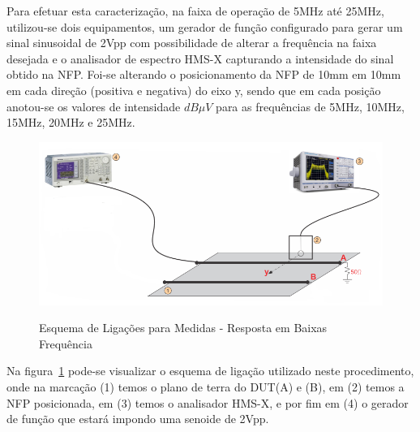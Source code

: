 Para efetuar esta caracterização, na faixa de operação de 5MHz até 25MHz, utilizou-se dois equipamentos, um gerador de função configurado para gerar um sinal sinusoidal de 2Vpp com possibilidade de alterar a frequência na faixa desejada e o analisador de espectro HMS-X capturando a intensidade do sinal obtido na NFP. Foi-se alterando o posicionamento da NFP de 10mm em 10mm em cada direção (positiva e negativa) do eixo y, sendo que em cada posição anotou-se os valores de intensidade $dB\mu V$ para as frequências de 5MHz, 10MHz, 15MHz, 20MHz e 25MHz.

\begin{figure}[htb!]
	\centering 
	\caption{Esquema de Ligações para Medidas - Resposta em Baixas Frequência}
	\includegraphics[scale=2.4]{./img/esquema4_fundo}
	\label{fig:esquema4_fundo}
\end{figure}

Na figura~\ref{fig:esquema4_fundo} pode-se visualizar o esquema de ligação utilizado neste procedimento, onde na marcação (1) temos o plano de terra do DUT(A) e (B), em (2) temos a NFP posicionada, em (3) temos o analisador HMS-X, e por fim em (4) o gerador de função que estará impondo uma senoide de 2Vpp.


